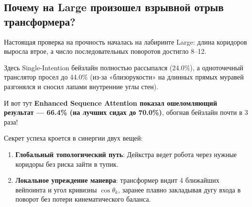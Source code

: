 \subsection{Почему на Large произошел взрывной отрыв трансформера?}
Настоящая проверка на прочность началась на лабиринте Large: длина коридоров выросла втрое, а число последовательных поворотов достигло 8--12.

Здесь Single-Intention бейзлайн полностью рассыпался (24.0\%), а одноточечный транслятор просел до 44.0\% (из-за «близорукости» на длинных прямых муравей разгонялся и сносил лапами внутренние углы стен).

И вот тут \textbf{Enhanced Sequence Attention показал ошеломляющий результат — 66.4\% (на лучших сидах до 70.0\%)}, обогнав бейзлайн почти в 3 раза! 

Секрет успеха кроется в синергии двух вещей:
\begin{enumerate}[leftmargin=*,noitemsep]
    \item \textbf{Глобальный топологический путь}: Дейкстра ведет робота через нужные коридоры без риска зайти в тупик.
    \item \textbf{Локальное упреждение маневра}: трансформер видит 4 ближайших вейпоинта и угол кривизны $\cos \theta_k$, заранее плавно закладывая дугу входа в поворот без потери кинематического баланса.
\end{enumerate}
